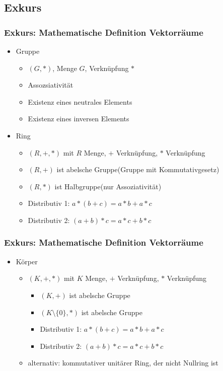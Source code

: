 \subsection{Exkurs}
\begin{frame}
    \frametitle{Exkurs: Mathematische Definition Vektorräume}
    \begin{itemize}
        \item Gruppe
        \begin{itemize}
            \item $(G,*)$, Menge $G$, Verknüpfung $*$
            \item Assozsiativität
            \item Existenz eines neutrales Elements
            \item Existenz eines inversen Elements
        \end{itemize}
        \item Ring
        \begin{itemize}
            \item $(R,+,*)$ mit $R$ Menge, $+$ Verknüpfung, $*$ Verknüpfung
            \item $(R,+)$ ist abelsche Gruppe(Gruppe mit Kommutativgesetz)
            \item $(R,*)$ ist Halbgruppe(nur Assoziativität)
            \item Distributiv 1: $a * (b + c) = a * b + a * c$
            \item Distributiv 2: $(a + b) * c = a * c + b * c$
        \end{itemize}
    \end{itemize}
\end{frame}

\begin{frame}
    \frametitle{Exkurs: Mathematische Definition Vektorräume}
    \begin{itemize}
        \item Körper
        \begin{itemize}
            \item $(K,+,*)$ mit $K$ Menge, $+$ Verknüpfung, $*$ Verknüpfung
            \begin{itemize}
                \item $(K,+)$ ist abelsche Gruppe
                \item $(K\setminus\{0\},*)$ ist abelsche Gruppe
                \item Distributiv 1: $a * (b + c) = a * b + a * c$
                \item Distributiv 2: $(a + b) * c = a * c + b * c$
            \end{itemize}
            \item alternativ: kommutativer unitärer Ring, der nicht Nullring ist
        \end{itemize}
    \end{itemize}
\end{frame}

